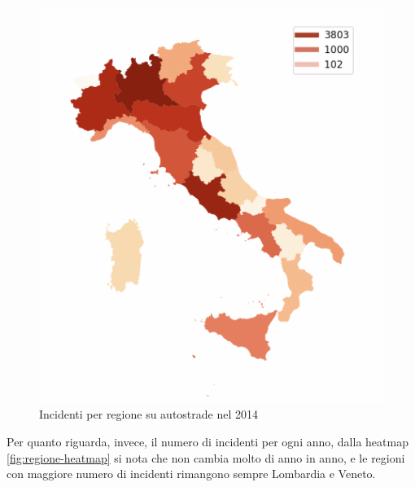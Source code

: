 \documentclass[a4paper]{report}
\begin{document}
\begin{figure}
    \includegraphics[width=\linewidth]{../src/incidenti/incidenti_aci/mappe_regioni/incidenti_regione_autostrade.png}
    \caption{Incidenti per regione su autostrade nel 2014}
    \label{fig:incidenti-regione-autostrade}
\end{figure}

Per quanto riguarda, invece, il numero di incidenti per ogni anno, 
dalla heatmap \ref{fig:regione-heatmap} 
si nota che non cambia molto di anno in anno, e le regioni con maggiore numero di incidenti rimangono 
sempre Lombardia e Veneto.
\end{document}
